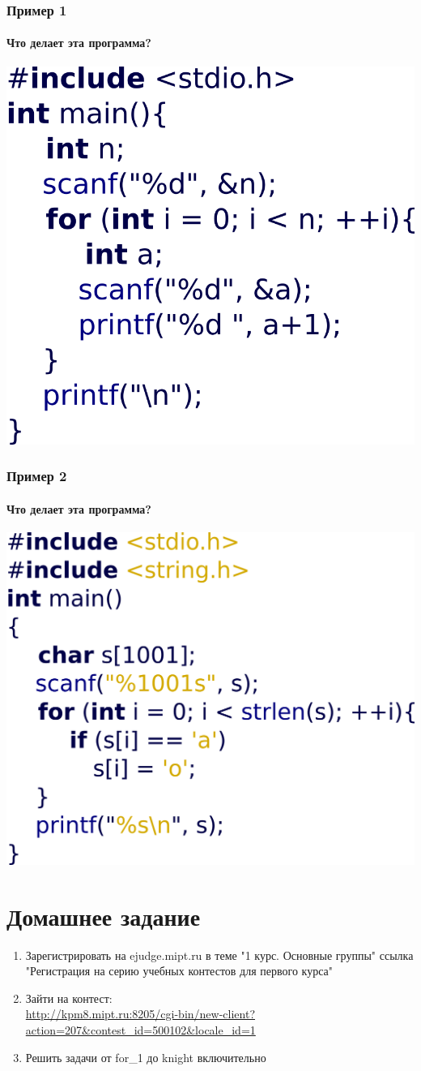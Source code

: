 \documentclass[12pt,pdf,hyperref={unicode}]{beamer}
\begin{document}
\begin{frame}[fragile]
\frametitle{Пример 1} 
\framesubtitle{Что делает эта программа?}
\begin{center}
\includegraphics[width=0.62\linewidth]{images/example1.png}
\end{center}
\end{frame}

\begin{frame}[fragile]
\frametitle{Пример 2} 
\framesubtitle{Что делает эта программа?}
\begin{center}
\includegraphics[width=0.62\linewidth]{images/example2.png}
\end{center}
\end{frame}

\section{Домашнее задание}

\begin{frame}
\begin{enumerate}
\item Зарегистрировать на ejudge.mipt.ru в теме "1 курс. Основные группы" ссылка "Регистрация на серию учебных контестов для первого курса"
\item Зайти на контест:\\
\url{http://kpm8.mipt.ru:8205/cgi-bin/new-client?action=207&contest_id=500102&locale_id=1}
\item Решить задачи от for\_1 до knight включительно
\end{enumerate}
\end{frame}
\end{document}
